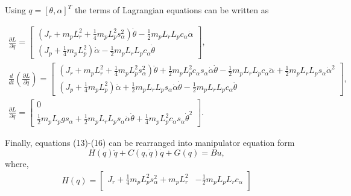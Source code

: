 \documentclass[superscriptaddress,floatfix,reprint,amssymb, amsmath,aps, pre]{revtex4-1}
\begin{document}
{{        Using \(q = [\theta,\alpha]^T\) the terms of Lagrangian equations can be written as 
        \begin{widetext}
            \begin{gather}
                \frac{\partial L}{\partial \dot q} = \begin{bmatrix}
                    \left(J_r + m_p L_r^2 + \frac{1}{4}m_p L_p^2 s_\alpha^2 \right)\dot \theta -\frac{1}{2} m_p L_r L_p c_\alpha \dot \alpha \\
                    \left(J_p +\frac{1}{4}m_p L_p^2\right) \dot \alpha - \frac{1}{2} m_p L_r L_p c_\alpha \dot \theta
                \end{bmatrix}, \\
                \frac{d}{dt}\left(\frac{\partial L}{\partial \dot q}\right) = 
                \begin{bmatrix}
                    \left(J_r + m_p L_r^2 +\frac{1}{4}m_p L_p^2 s_\alpha^2\right) \ddot\theta +\frac{1}{2}m_p L_p^2 c_\alpha s_\alpha \dot \alpha \dot \theta - \frac{1}{2} m_p L_r L_p c_\alpha \ddot \alpha + \frac{1}{2} m_p L_r L_p s_\alpha \dot \alpha^2 \\
                    \left(J_p +\frac{1}{4}m_p L_p^2\right) \ddot \alpha + \frac{1}{2} m_p L_r L_p s_\alpha \dot \alpha \dot \theta -\frac{1}{2} m_p L_r L_p c_\alpha \ddot \theta
                \end{bmatrix},\\
                \frac{\partial L}{\partial q} = \begin{bmatrix}
                    0 \\
                    \frac{1}{2} m_p L_p g s_\alpha + \frac{1}{2} m_p L_r L_p s_\alpha \dot \alpha \dot \theta + \frac{1}{4} m_p L_p^2 c_\alpha s_\alpha \dot \theta^2  
                \end{bmatrix}.
            \end{gather}
        \end{widetext}
        Finally, equations (13)-(16) can be rearranged into manipulator equation form 
        \begin{equation}
            H(q) \ddot q + C(q,\dot q) \dot q + G(q) = Bu, \label{eq:manipulatorEq}
        \end{equation}
        where, 
        \begin{gather*}
            H(q) = \begin{bmatrix}
                J_r +\frac{1}{4}m_p L_p^2 s_\alpha^2 + m_p L_r^2 & -\frac{1}{2} m_p L_p L_r c_\alpha\\

\end{bmatrix}
\end{gather*}}}
\end{document}
